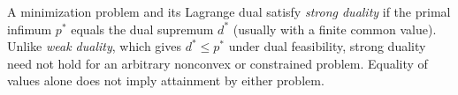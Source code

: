 
A minimization problem and its Lagrange dual satisfy \emph{strong duality} if the primal infimum $p^*$ equals the dual supremum $d^*$ (usually with a finite common value). Unlike \emph{weak duality}, which gives $d^*\le p^*$ under dual feasibility, strong duality need not hold for an arbitrary nonconvex or constrained problem. Equality of values alone does not imply attainment by either problem.
